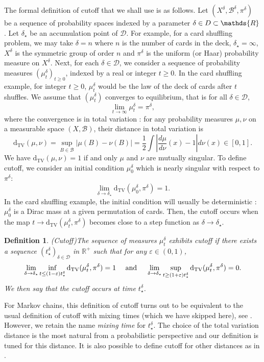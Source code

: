 \documentclass[]{scrartcl}
\newcommand{\DTV}{\mathrm{d_{TV}}}
\newcommand{\cB}{\mathcal B}
\newcommand{\cD}{\mathcal D}
\newcommand{\R}{\mathds{R}}
\newcommand{\Rp}{\R^{+}}
\newcommand{\eps}{\varepsilon}
\newtheorem{definition}[theorem]{Definition}
\numberwithin{equation}{section}
\numberwithin{figure}{section}
\begin{document}
		The formal definition of cutoff that we shall use is as follows. Let $(X^\delta,\cB^\delta,\pi^\delta)$ be a sequence of probability spaces indexed by a parameter $\delta \in \mathcal \cD \subset \R$. Let $\delta_\star$ be an accumulation point of $\cD$. For example, for a card shuffling problem, we may take $\delta = n$ where $n$ is the number of cards in the deck, $\delta_\star = \infty$, $X^\delta$ is the symmetric group of order $n$  and $\pi^\delta$ is the uniform (or Haar) probability measure on $X^\delta$.  Next, for each $\delta \in \cD$, we consider a sequence of probability measures  $(\mu^\delta_t)_{t \geq 0}$, indexed by a real or integer $t \geq 0$. In the card shuffling example, for integer $t \geq 0$, $\mu^\delta_t$ would be the law of the deck of cards after $t$ shuffles. We assume that $(\mu^\delta_t)$ converges to equilibrium, that is for all $\delta \in \cD$, 
	\begin{equation}\label{eq:conveq}
		\lim_{t \to \infty} \mu_t^\delta = \pi^\delta,
		\end{equation}
	where the convergence is in total variation : for any probability measures $\mu,\nu$ on a measurable space $(X,\cB)$, their distance in total variation is
	\begin{equation}\label{def:TV}
	\DTV (\mu,\nu)  = \sup_{ B \in \cB} | \mu(B) - \nu(B) | =  \frac 1 2 \int \left| \frac{d \mu}{d \nu}(x) - 1    \right| d\nu(x)  \in [0,1].
	\end{equation}
We have $\DTV(\mu,\nu) = 1$ if and only $\mu$ and $\nu$ are mutually singular. To define cutoff, we consider an initial condition $\mu^\delta_0$ which is nearly singular with respect to $\pi^\delta$: 
$$
\lim_{\delta \to \delta_\star} \DTV( \mu^\delta_0 , \pi^\delta) = 1.
$$
In the card shuffling example, the initial condition will usually be deterministic : $\mu_0^\delta$ is a Dirac mass at a given permutation of cards.  Then, the cutoff occurs when the map $t \to \DTV (\mu^\delta_t,\pi^\delta)$ becomes close to a step function  as $\delta \to \delta_\star$. 	
	\begin{definition}{(Cutoff)}\label{defi:cutoff}
 The sequence of measures $\mu_t^\delta$ exhibits cutoff  if there exists a sequence $(t_\star^\delta)_{\delta \in \cD}$  in $\Rp$ such that for any $\eps \in (0,1)$, 
	$$
	\lim_{\delta \to \delta_\star}  \inf_{t \leq (1-\eps) t_\star^\delta} \DTV (\mu^\delta_t,\pi^\delta) = 1 \quad \hbox{ and } \quad  	\lim_{\delta \to \delta_\star}  \sup_{t \geq (1 + \eps) t_\star^\delta} \DTV (\mu^\delta_t,\pi^\delta) = 0.
	$$
	We then say that the cutoff occurs at time $t_\star^\delta$. 
	\end{definition}
 For Markov chains, this definition of cutoff turns out to be equivalent to the usual definition of cutoff with mixing times (which we have skipped here), see \cite{MR3726904}. However, we retain the name \textit{mixing time} for $t_\star^\delta$. The choice of the total variation distance is the most natural from a probabilistic perspective and our definition is tuned for this distance. It is also possible to define cutoff for other distances as in \cite{MR2375599,MR3558308}. 
 
\end{document}
